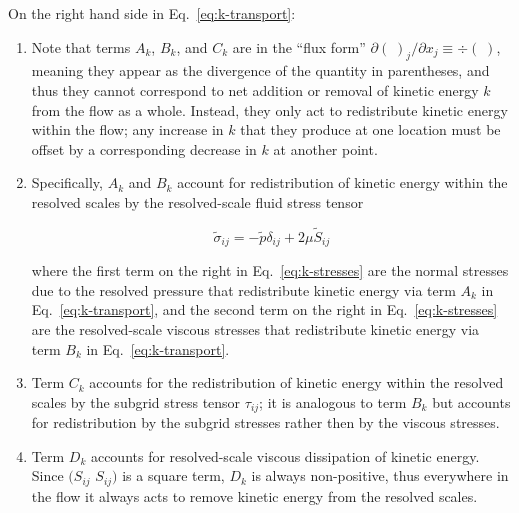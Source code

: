On the right hand side in Eq.~\ref{eq:k-transport}:
\begin{enumerate}
    \item Note that terms $A_{k}$, $B_{k}$, and $C_{k}$ are in the ``flux form''
        $\partial(\;)_{j}/\partial x_{j} \equiv \div (\;)$, meaning they
        appear as the divergence of the quantity in parentheses, and thus
        they cannot correspond to net addition or removal of kinetic
        energy $k$ from the flow as a whole. Instead, they only act to
        redistribute kinetic energy within the flow; any increase in $k$
        that they produce at one location must be offset by a corresponding
        decrease in $k$ at another point.

    \item Specifically, $A_{k}$ and $B_{k}$ account for redistribution of kinetic
        energy within the resolved scales by the resolved-scale fluid
        stress tensor 
        
        \begin{equation}
            \widetilde{\sigma}_{ij} = - \widetilde{p} \delta_{ij} + 2 \mu \widetilde{S}_{ij}
            \label{eq:k-stresses}
        \end{equation}

        where the first term on the right in Eq.~\ref{eq:k-stresses} are the
        normal stresses due to the resolved pressure that redistribute
        kinetic energy via term $A_{k}$ in Eq.~\ref{eq:k-transport}, and the
        second term on the right in Eq.~\ref{eq:k-stresses} are the 
        resolved-scale viscous stresses that redistribute kinetic energy
        via term $B_{k}$ in Eq.~\ref{eq:k-transport}.

    \item Term $C_{k}$ accounts for the redistribution of kinetic energy within
        the resolved scales by the subgrid stress tensor $\tau_{ij}$; it is
        analogous to term $B_{k}$ but accounts for redistribution by the 
        subgrid stresses rather then by the viscous stresses.

    \item Term $D_{k}$ accounts for resolved-scale viscous dissipation of
        kinetic energy. Since $(S_{ij}$ $S_{ij})$ is a square term, $D_{k}$ is
        always non-positive, thus everywhere in the flow it always acts to
        remove kinetic energy from the resolved scales.


\end{enumerate}
